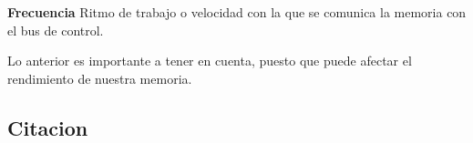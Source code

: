 \documentclass{article}
\begin{document}
	\begin{tcolorbox}[colupper=red!75!black]
		\textbf{Frecuencia}
		\tcblower
		Ritmo de trabajo o velocidad con la que se comunica la memoria con el bus de control.
	\end{tcolorbox}
	Lo anterior es importante a tener en cuenta, puesto que puede afectar el rendimiento de nuestra memoria.
	
	\subsection{Citacion}
	
	
\end{document}
